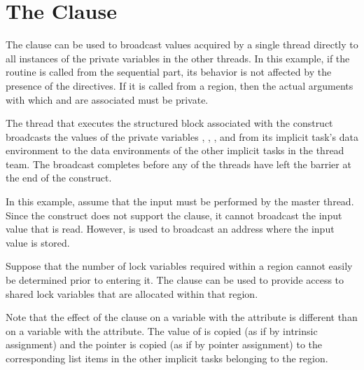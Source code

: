 \pagebreak
\chapter{The  Clause}
\label{chap:copyprivate}

The  clause can be used to broadcast values acquired by a single 
thread directly to all instances of the private variables in the other threads. 
In this example, if the routine is called from the sequential part, its behavior 
is not affected by the presence of the directives. If it is called from a  
region, then the actual arguments with which  and  are associated 
must be private. 

The thread that executes the structured block associated with the  
 construct broadcasts the values of the private variables , , 
, and 
 from its implicit task's data environment to the data environments 
of the other implicit tasks in the thread team. The broadcast completes before 
any of the threads have left the barrier at the end of the construct.



In this example, assume that the input must be performed by the master thread. 
Since the  construct does not support the  clause, 
it cannot broadcast the input value that is read. However,  
is used to broadcast an address where the input value is stored.



Suppose that the number of lock variables required within a  region 
cannot easily be determined prior to entering it. The  clause 
can be used to provide access to shared lock variables that are allocated within 
that  region.


\fortranspecificstart
{}

Note that the effect of the  clause on a variable with the 
 attribute is different than on a variable with the  
attribute. The value of  is copied (as if by intrinsic assignment) and 
the pointer  is copied (as if by pointer assignment) to the corresponding 
list items in the other implicit tasks belonging to the  region. 

\fortranspecificend


